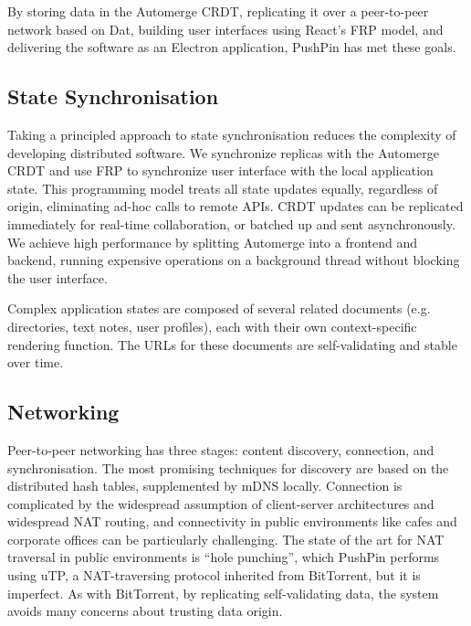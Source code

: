 \documentclass[sigplan,10pt]{acmart}
\begin{document}
By storing data in the Automerge CRDT, replicating it over a peer-to-peer network based on Dat, building user interfaces using React's FRP model, and delivering the software as an Electron application, PushPin has met these goals.

\subsection{State Synchronisation}

Taking a principled approach to state synchronisation reduces the complexity of developing distributed software. We synchronize replicas with the Automerge CRDT and use FRP to synchronize user interface with the local application state. This programming model treats all state updates equally, regardless of origin, eliminating ad-hoc calls to remote APIs. CRDT updates can be replicated immediately for real-time collaboration, or batched up and sent asynchronously. We achieve high performance by splitting Automerge into a frontend and backend, running expensive operations on a background thread without blocking the user interface.

Complex application states are composed of several related documents (e.g. directories, text notes, user profiles), each with their own context-specific rendering function. The URLs for these documents are self-validating and stable over time.

\subsection{Networking}

Peer-to-peer networking has three stages: content discovery, connection, and synchronisation. The most promising techniques for discovery are based on the distributed hash tables, supplemented by mDNS locally. Connection is complicated by the widespread assumption of client-server architectures and widespread NAT routing, and connectivity in public environments like cafes and corporate offices can be particularly challenging.  The state of the art for NAT traversal in public environments is ``hole punching'', which PushPin performs using uTP, a NAT-traversing protocol inherited from BitTorrent, but it is imperfect. As with BitTorrent, by replicating self-validating data, the system avoids many concerns about trusting data origin.
\end{document}
